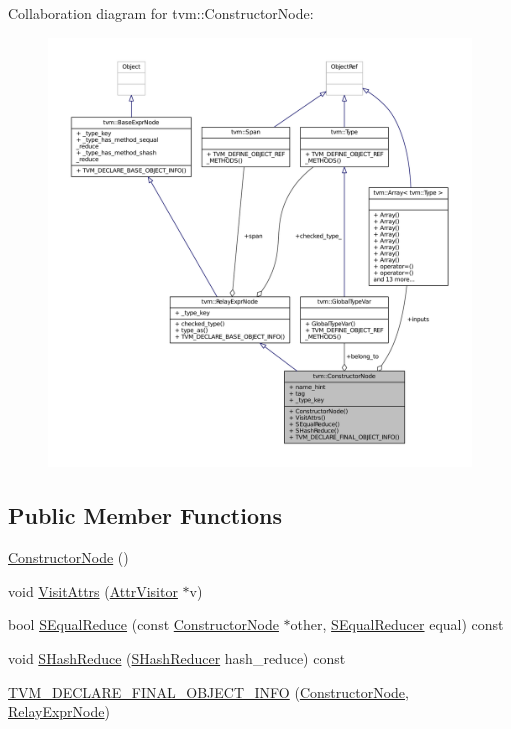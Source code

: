 Collaboration diagram for tvm\+:\+:Constructor\+Node\+:
\nopagebreak
\begin{figure}[H]
\begin{center}
\leavevmode
\includegraphics[width=350pt]{classtvm_1_1ConstructorNode__coll__graph}
\end{center}
\end{figure}
\subsection*{Public Member Functions}
\begin{DoxyCompactItemize}
\item 
\hyperlink{classtvm_1_1ConstructorNode_ab53a12f5a1ab1d262c49c16d189fe27c}{Constructor\+Node} ()
\item 
void \hyperlink{classtvm_1_1ConstructorNode_a7137fbec25bcaae585f532221402e892}{Visit\+Attrs} (\hyperlink{classtvm_1_1AttrVisitor}{Attr\+Visitor} $\ast$v)
\item 
bool \hyperlink{classtvm_1_1ConstructorNode_a1dbaf14ddf82ff3640cf539962955179}{S\+Equal\+Reduce} (const \hyperlink{classtvm_1_1ConstructorNode}{Constructor\+Node} $\ast$other, \hyperlink{classtvm_1_1SEqualReducer}{S\+Equal\+Reducer} equal) const 
\item 
void \hyperlink{classtvm_1_1ConstructorNode_a7172a526b7d29085678fa01fba20fdf4}{S\+Hash\+Reduce} (\hyperlink{classtvm_1_1SHashReducer}{S\+Hash\+Reducer} hash\+\_\+reduce) const 
\item 
\hyperlink{classtvm_1_1ConstructorNode_af21463fd4d36fa74261a95bc7700d2c5}{T\+V\+M\+\_\+\+D\+E\+C\+L\+A\+R\+E\+\_\+\+F\+I\+N\+A\+L\+\_\+\+O\+B\+J\+E\+C\+T\+\_\+\+I\+N\+FO} (\hyperlink{classtvm_1_1ConstructorNode}{Constructor\+Node}, \hyperlink{classtvm_1_1RelayExprNode}{Relay\+Expr\+Node})
\end{DoxyCompactItemize}
